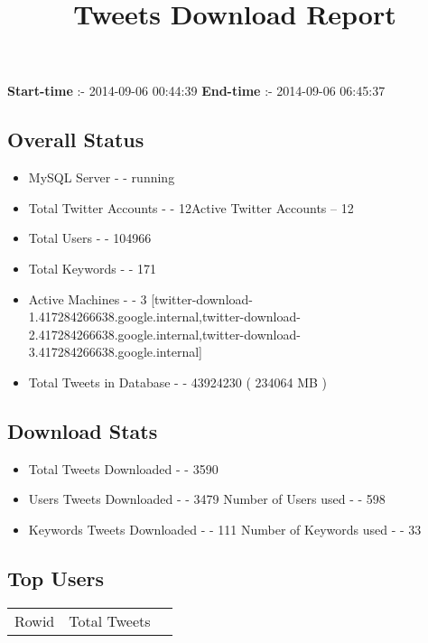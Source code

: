 \documentclass{article}\usepackage[T1]{fontenc}
\begin{document}
\title{\textbf{Tweets Download Report}}
               \date{}
                \maketitle
               \centerline{\textbf{Start-time} :- 2014-09-06 00:44:39 \hspace{40pt} \textbf{End-time} :- 2014-09-06 06:45:37}               \subsection*{Overall Status}                \begin{itemize}                \item MySQL Server - - running               \item Total Twitter Accounts - - 12\newline Active Twitter Accounts -- 12               \item Total Users - - 104966               \item Total Keywords - - 171               \item Active Machines - - 3 [twitter-download-1.417284266638.google.internal,twitter-download-2.417284266638.google.internal,twitter-download-3.417284266638.google.internal]               \item Total Tweets in Database - - 43924230 ( 234064 MB )               \end{itemize}               \subsection*{Download Stats}                \begin{itemize}                \item Total Tweets Downloaded - - 3590               \item Users Tweets Downloaded - - 3479 \newline Number of Users used - - 598               \item Keywords Tweets Downloaded - - 111 \newline Number of Keywords used - - 33              \end{itemize}              \subsection*{Top Users}\begin{tabular}{|c|c|c|}         \hline         Rowid & Total Tweets \\ 

\end{tabular}
\end{document}
